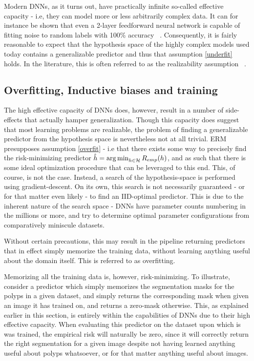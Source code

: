		Modern DNNs, as it turns out, have practically infinite so-called effective capacity - i.e, they can model more or less arbitrarily complex data. It can for instance be shown that even a 2-layer feedforward neural network is capable of fitting noise to random labels with 100\% accuracy ~\cite{randomlabels}. Consequently, it is fairly reasonable to expect that the hypothesis space of the highly complex models used today contains a generalizable predictor and thus that assumption \ref{underfit} holds. In the literature, this is often referred to as the realizability assumption ~\cite{machine_learning_theory}. 
		
	\subsection{Overfitting, Inductive biases and training}
	The high effective capacity of DNNs does, however, result in a number of side-effects that actually hamper generalization. Though this capacity does suggest that most learning problems are realizable, the problem of finding a generalizable predictor from the hypothesis space is nevertheless not at all trivial. ERM presupposes assumption \ref{overfit} - i.e that there exists some way to precisely find the risk-minimizing predictor \(\hat{h} = \operatorname*{arg\,min}_{h \in \mathcal{H}}R_{emp}(h)\), and as such that there is some ideal optimization procedure that can be leveraged to this end. This, of course, is not the case. Instead, a search of the hypothesis-space is performed using gradient-descent. On its own, this search is not necessarily guaranteed - or for that matter even likely - to find an IID-optimal predictor. This is due to the inherent nature of the search space - DNNs have parameter counts numbering in the millions or more, and try to determine optimal parameter configurations from comparatively miniscule datasets.
		
	Without certain precautions, this may result in the pipeline returning predictors that in effect simply memorize the training data, without learning anything useful about the domain itself. This is referred to as overfitting. 

	Memorizing all the training data is, however, risk-minimizing. To illustrate, consider a predictor which simply memorizes the segmentation masks for the polyps in a given dataset, and simply returns the corresponding mask when given an image it has trained on, and returns a zero-mask otherwise. This, as explained earlier in this section, is entirely within the capabilities of DNNs due to their high effective capacity. When evaluating this predictor on the dataset upon which is was trained, the empirical risk will naturally be zero, since it will correctly return the right segmentation for a given image despite not having learned anything useful about polyps whatsoever, or for that matter anything useful about images.

